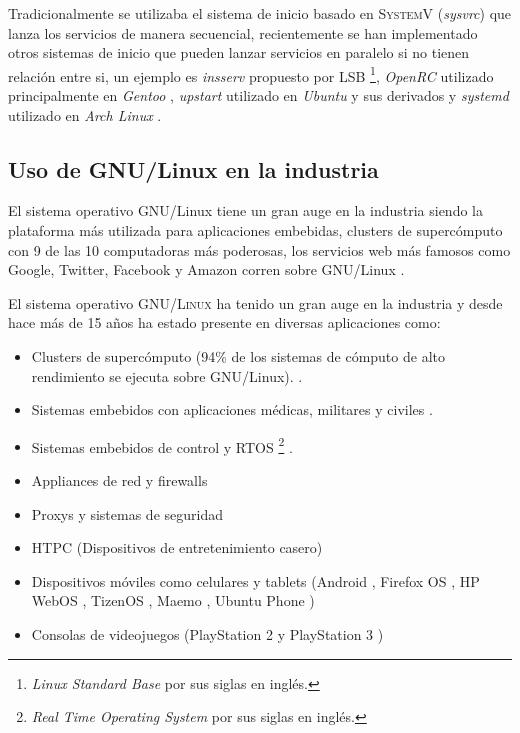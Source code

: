 Tradicionalmente se utilizaba el sistema de inicio basado en \textsc{SystemV} (\textit{sysvrc}) que lanza los servicios de manera secuencial, recientemente se han implementado otros sistemas de inicio que pueden lanzar servicios en paralelo si no tienen relaci\'{o}n entre si, un ejemplo es \textit{insserv} propuesto por \textsc{LSB} \cite{_lsbinitscripts_????}\cite{_lsbinitscripts/dependencybasedboot_????} \footnote{\textit{Linux Standard Base} por sus siglas en ingl\'{e}s.}, \textit{OpenRC} utilizado principalmente en \textit{Gentoo} \cite{_gentoo_????}\cite{_openrc_????}\cite{_openrc_????-1}, \textit{upstart} utilizado en \textit{Ubuntu} y sus derivados \cite{_upstart_????} y \textit{systemd} utilizado en \textit{Arch Linux} \cite{_systemd_????}.


  \subsection {Uso de GNU/Linux en la industria}

El sistema operativo GNU/Linux tiene un gran auge en la industria siendo la plataforma m\'{a}s utilizada para aplicaciones embebidas, clusters de superc\'{o}mputo con 9 de las 10 computadoras m\'{a}s poderosas, los servicios web m\'{a}s famosos como Google, Twitter, Facebook y Amazon corren sobre GNU/Linux \cite{_how_????}.

El sistema operativo \textsc{GNU/Linux} ha tenido un gran auge en la industria y desde hace m\'{a}s de 15 a\~{n}os ha estado presente en diversas aplicaciones como:

\begin{itemize}
  \item Clusters de superc\'{o}mputo (94\% de los sistemas de c\'{o}mputo de alto rendimiento se ejecuta sobre GNU/Linux). \cite{_tic_????}\cite{_94_????}.
  \item Sistemas embebidos con aplicaciones m\'{e}dicas, militares y civiles \cite{_elinux.org_????}\cite{_rtos_????}.
  \item Sistemas embebidos de control y \textsc{RTOS} \footnote{\textit{Real Time Operating System} por sus siglas en ingl\'{e}s.} \cite{_uclinux_????}\cite{_rtos_????}.
  \item Appliances de red y firewalls \cite{_router/bridge_????}\cite{_endian_????}
  \item Proxys y sistemas de seguridad \cite{_f5_????}\cite{_junos_????}\cite{_infoblox_????}
  \item \textsc{HTPC} (Dispositivos de entretenimiento casero) \cite{_openelec_????}
  \item Dispositivos m\'{o}viles como celulares y tablets (Android \cite{_android_????}, Firefox OS \cite{_firefox_????}, HP WebOS \cite{_hp_????}, TizenOS \cite{_tizen_????}, Maemo \cite{_maemo.org_????}, Ubuntu Phone \cite{_ubuntu_????})
  \item Consolas de videojuegos (PlayStation 2 \cite{_ps2_????} y PlayStation 3 \cite{_open_????})
\end{itemize}

